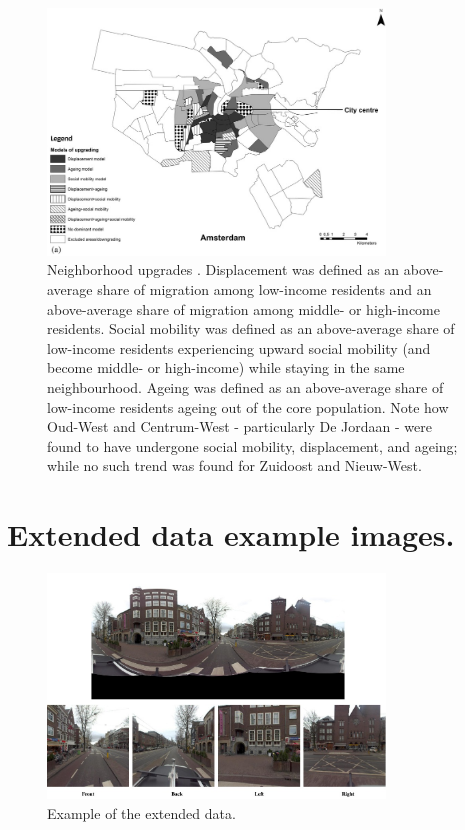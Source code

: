 \begin{appendices}
{    \begin{figure}[h!]
        \centering
        \includegraphics[width=0.8\textwidth]{media/methodology/neighbourhood_models.jpg}
        \caption{Neighborhood upgrades \cite{hochstenbach_anatomy_2015}. Displacement was defined as an above-average share of migration among low-income residents and an above-average share of migration among middle- or high-income residents. Social mobility was defined as an above-average share of low-income residents experiencing upward social mobility (and become middle- or high-income) while staying in the same neighbourhood. Ageing was defined as an above-average share of low-income residents ageing out of the core population. Note how Oud-West and Centrum-West - particularly De Jordaan - were found to have undergone social mobility, displacement, and ageing; while no such trend was found for Zuidoost and Nieuw-West.}
    \end{figure}
    }

\section{Extended data example images.}
\label{sec:apx:pano_example}

    \begin{figure}[H]
        \centering
        \includegraphics[width=0.8\textwidth]{media/methodology/data_ex/extended/pano_example.jpg}
        \caption{Example of the extended data.}
    \end{figure}



\end{appendices}
